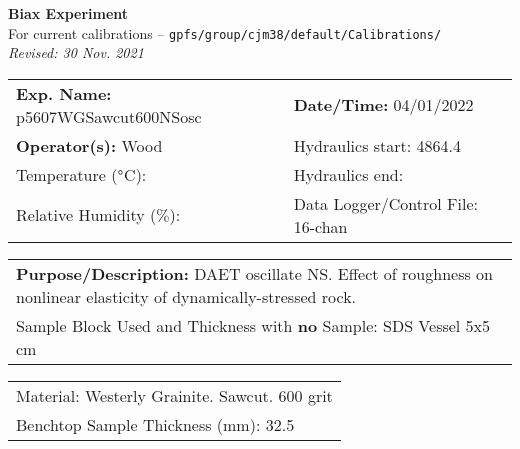 \documentclass[letterpaper, 10pt]{article}
\begin{document}
\begin{center}
    {\Large \textbf{Biax Experiment}}\\
    {\small For current calibrations -- \texttt{gpfs/group/cjm38/default/Calibrations/}}\\
    {\footnotesize \textit{Revised: 30 Nov. 2021}}
\end{center}



\begin{table}[!ht]
	\renewcommand{\arraystretch}{1.1}
	\begin{tabular}{p{10cm} p{10cm} }
	    \textbf{Exp. Name: }p5607WGSawcut600NSosc & \textbf{Date/Time: }04/01/2022\\
	    \textbf{Operator(s): }Wood & Hydraulics start: 4864.4 \\
	    Temperature ($\degree$C):  & Hydraulics end:  \\
	    Relative Humidity ($\%$):  & Data Logger/Control File: 16-chan \\
	\end{tabular}
\end{table} 
\vspace{-0.5cm} 

\begin{table}[!ht]
	\renewcommand{\arraystretch}{1.1}
	\begin{tabular}{p{20cm}}\textbf{Purpose/Description:} DAET oscillate NS. Effect of roughness on nonlinear elasticity of dynamically-stressed rock.  \\Sample Block Used and Thickness with \textbf{no} Sample: SDS Vessel 5x5 cm \\
	\end{tabular}
    \end{table} \vspace{-0.5cm} 

\begin{table}[!ht]
        \small
        \renewcommand{\arraystretch}{1.2}
        \begin{tabular}{ |p{7cm}| } \hline 
Material: Westerly Grainite. Sawcut. 600 grit \\Benchtop Sample Thickness (mm): 32.5 \\ \hline \end{tabular} \end{table} \vspace{-0.5cm} 
\end{document}

